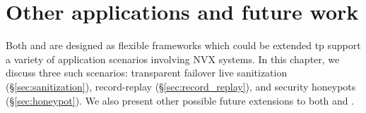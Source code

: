 \chapter{Other applications and future work}
\label{chap:applications}

Both \mx and \varan are designed as flexible frameworks which could be extended
tp support a variety of application scenarios involving NVX systems. In this
chapter, we discuss three such scenarios: transparent failover live
sanitization (\S\ref{sec:sanitization}), record-replay
(\S\ref{sec:record_replay}), and security honeypots (\S\ref{sec:honeypot}). We
also present other possible future extensions to both \mx and \varan.








